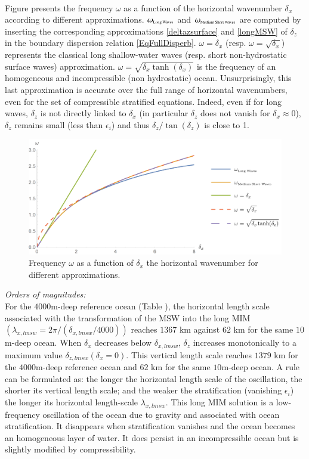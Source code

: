 \\
%
%
Figure  presents the frequency $\omega$ as a function of the horizontal wavenumber $\delta_x$ according to different approximations. $\omega_{\mbox{\tiny Long Waves}}$ and $\omega_{\mbox{\tiny Medium Short Waves}}$ are computed by inserting the corresponding approximations \ref{deltazsurface} and \ref{longMSW} of $\delta_z$ in the boundary dispersion relation \ref{EqFullDisperb}. $\omega=\delta_x$ (resp. $\omega=\sqrt{\delta_x}$) represents the classical long shallow-water waves (resp. short non-hydrostatic surface waves) approximation. $\omega=\sqrt{\delta_x \tanh(\delta_x)}$ is the frequency of an homogeneous and incompressible (non hydrostatic) ocean. Unsurprisingly, this last approximation is accurate over the full range of horizontal wavenumbers, even for the set of compressible stratified equations. Indeed, even if for long waves, $\delta_z$ is not directly linked to $\delta_x$ (in particular $\delta_z$ does not vanish for $\delta_x \approx 0$), $\delta_z$ remains small (less than $\epsilon_i$) and thus $\delta_z/\tan(\delta_z)$ is close to 1.
\begin{figure}[h]
	\centerline{
		\includegraphics[width=0.9\linewidth]{FIGURES/omegadx.png}
	}
	\caption{Frequency $\omega$ as a function of $\delta_x$ the horizontal wavenumber for different approximations.}
	\label{omegadx}
\end{figure}


\textit{Orders of magnitudes:}\\
For the $4000$m-deep reference ocean (Table ), the horizontal length scale associated with the transformation of the MSW into the long MIM $(\lambda_{x,lmsw}=2\pi/(\delta_{x,lmsw}/4000))$ reaches $1367$ km against $62$ km for the same $10$m-deep ocean. When $\delta_x$ decreases below $\delta_{x,lmsw}$, $\delta_z$ increases monotonically to a maximum value $\delta_{z,lmsw}(\delta_x=0)$. This vertical length scale reaches $1379$ km for the $4000$m-deep reference ocean and $62$ km for the same $10$m-deep ocean. A rule can be formulated as: the longer the horizontal length scale of the oscillation, the shorter its vertical length scale; and the weaker the stratification (vanishing $\epsilon_i$) the longer its horizontal length-scale $\lambda_{x,lmsw}$. This long MIM solution is a low-frequency oscillation of the ocean due to gravity and associated with ocean stratification. It disappears when stratification vanishes and the ocean becomes an homogeneous layer of water. It does persist in an incompressible ocean but is slightly modified by compressibility.

